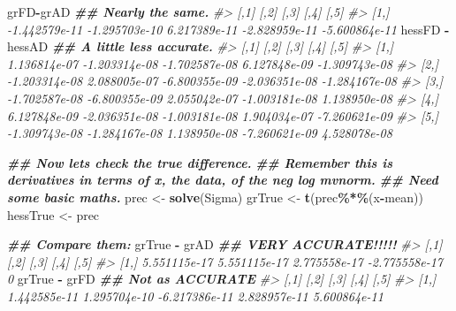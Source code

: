 \documentclass[
]{article}
\newenvironment{Shaded}{\begin{snugshade}}{\end{snugshade}}
\newcommand{\CommentTok}[1]{\textcolor[rgb]{0.56,0.35,0.01}{\textit{#1}}}
\newcommand{\DocumentationTok}[1]{\textcolor[rgb]{0.56,0.35,0.01}{\textbf{\textit{#1}}}}
\newcommand{\FunctionTok}[1]{\textcolor[rgb]{0.13,0.29,0.53}{\textbf{#1}}}
\newcommand{\NormalTok}[1]{#1}
\newcommand{\OtherTok}[1]{\textcolor[rgb]{0.56,0.35,0.01}{#1}}
\newcommand{\SpecialCharTok}[1]{\textcolor[rgb]{0.81,0.36,0.00}{\textbf{#1}}}
\begin{document}
\begin{Shaded}
\begin{Highlighting}[]
\NormalTok{  grFD}\SpecialCharTok{{-}}\NormalTok{grAD         }\DocumentationTok{\#\# Nearly the same.}
\CommentTok{\#\textgreater{}               [,1]          [,2]         [,3]          [,4]          [,5]}
\CommentTok{\#\textgreater{} [1,] {-}1.442579e{-}11 {-}1.295703e{-}10 6.217389e{-}11 {-}2.828959e{-}11 {-}5.600864e{-}11}
\NormalTok{  hessFD }\SpecialCharTok{{-}}\NormalTok{ hessAD   }\DocumentationTok{\#\# A little less accurate.}
\CommentTok{\#\textgreater{}               [,1]          [,2]          [,3]          [,4]          [,5]}
\CommentTok{\#\textgreater{} [1,]  1.136814e{-}07 {-}1.203314e{-}08 {-}1.702587e{-}08  6.127848e{-}09 {-}1.309743e{-}08}
\CommentTok{\#\textgreater{} [2,] {-}1.203314e{-}08  2.088005e{-}07 {-}6.800355e{-}09 {-}2.036351e{-}08 {-}1.284167e{-}08}
\CommentTok{\#\textgreater{} [3,] {-}1.702587e{-}08 {-}6.800355e{-}09  2.055042e{-}07 {-}1.003181e{-}08  1.138950e{-}08}
\CommentTok{\#\textgreater{} [4,]  6.127848e{-}09 {-}2.036351e{-}08 {-}1.003181e{-}08  1.904034e{-}07 {-}7.260621e{-}09}
\CommentTok{\#\textgreater{} [5,] {-}1.309743e{-}08 {-}1.284167e{-}08  1.138950e{-}08 {-}7.260621e{-}09  4.528078e{-}08}
  
  \DocumentationTok{\#\# Now let\textquotesingle{}s check the true difference. }
  \DocumentationTok{\#\# Remember this is derivatives in terms of x, the data, of the neg log mvnorm.}
  \DocumentationTok{\#\# Need some basic maths.}
\NormalTok{  prec }\OtherTok{\textless{}{-}} \FunctionTok{solve}\NormalTok{(Sigma)}
\NormalTok{  grTrue }\OtherTok{\textless{}{-}} \FunctionTok{t}\NormalTok{(prec}\SpecialCharTok{\%*\%}\NormalTok{(x}\SpecialCharTok{{-}}\NormalTok{mean))}
\NormalTok{  hessTrue }\OtherTok{\textless{}{-}}\NormalTok{ prec}
  
  \DocumentationTok{\#\# Compare them:}
\NormalTok{  grTrue }\SpecialCharTok{{-}}\NormalTok{ grAD }\DocumentationTok{\#\# VERY ACCURATE!!!!!}
\CommentTok{\#\textgreater{}              [,1]         [,2]         [,3]          [,4] [,5]}
\CommentTok{\#\textgreater{} [1,] 5.551115e{-}17 5.551115e{-}17 2.775558e{-}17 {-}2.775558e{-}17    0}
\NormalTok{  grTrue }\SpecialCharTok{{-}}\NormalTok{ grFD }\DocumentationTok{\#\# Not as ACCURATE}
\CommentTok{\#\textgreater{}              [,1]         [,2]          [,3]         [,4]         [,5]}
\CommentTok{\#\textgreater{} [1,] 1.442585e{-}11 1.295704e{-}10 {-}6.217386e{-}11 2.828957e{-}11 5.600864e{-}11}
  

\end{Highlighting}
\end{Shaded}
\end{document}

